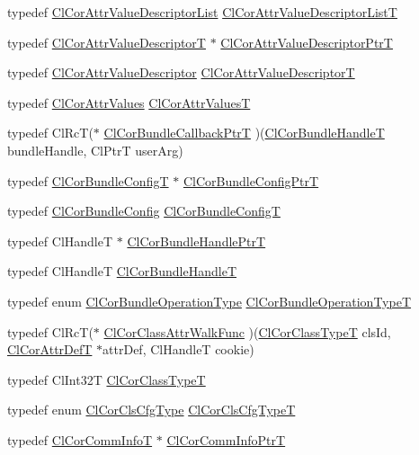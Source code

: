 \begin{CompactItemize}
\item 
typedef \hyperlink{struct_cl_cor_attr_value_descriptor_list}{Cl\-Cor\-Attr\-Value\-Descriptor\-List} \hyperlink{group__group13_ga47}{Cl\-Cor\-Attr\-Value\-Descriptor\-List\-T}
\item 
typedef \hyperlink{struct_cl_cor_attr_value_descriptor}{Cl\-Cor\-Attr\-Value\-Descriptor\-T} $\ast$ \hyperlink{group__group13_ga46}{Cl\-Cor\-Attr\-Value\-Descriptor\-Ptr\-T}
\item 
typedef \hyperlink{struct_cl_cor_attr_value_descriptor}{Cl\-Cor\-Attr\-Value\-Descriptor} \hyperlink{group__group13_ga45}{Cl\-Cor\-Attr\-Value\-Descriptor\-T}
\item 
typedef \hyperlink{struct_cl_cor_attr_values}{Cl\-Cor\-Attr\-Values} \hyperlink{group__group13_ga11}{Cl\-Cor\-Attr\-Values\-T}
\item 
typedef Cl\-Rc\-T($\ast$ \hyperlink{group__group13_ga56}{Cl\-Cor\-Bundle\-Callback\-Ptr\-T} )(\hyperlink{group__group13_ga7}{Cl\-Cor\-Bundle\-Handle\-T} bundle\-Handle, Cl\-Ptr\-T user\-Arg)
\item 
typedef \hyperlink{struct_cl_cor_bundle_config}{Cl\-Cor\-Bundle\-Config\-T} $\ast$ \hyperlink{group__group13_ga52}{Cl\-Cor\-Bundle\-Config\-Ptr\-T}
\item 
typedef \hyperlink{struct_cl_cor_bundle_config}{Cl\-Cor\-Bundle\-Config} \hyperlink{group__group13_ga51}{Cl\-Cor\-Bundle\-Config\-T}
\item 
typedef Cl\-Handle\-T $\ast$ \hyperlink{group__group13_ga8}{Cl\-Cor\-Bundle\-Handle\-Ptr\-T}
\item 
typedef Cl\-Handle\-T \hyperlink{group__group13_ga7}{Cl\-Cor\-Bundle\-Handle\-T}
\item 
typedef enum \hyperlink{group__group13_ga336}{Cl\-Cor\-Bundle\-Operation\-Type} \hyperlink{group__group13_ga20}{Cl\-Cor\-Bundle\-Operation\-Type\-T}
\item 
typedef Cl\-Rc\-T($\ast$ \hyperlink{group__group13_ga14}{Cl\-Cor\-Class\-Attr\-Walk\-Func} )(\hyperlink{group__group13_ga2}{Cl\-Cor\-Class\-Type\-T} cls\-Id, \hyperlink{struct_cl_cor_attr_def}{Cl\-Cor\-Attr\-Def\-T} $\ast$attr\-Def, Cl\-Handle\-T cookie)
\item 
typedef Cl\-Int32T \hyperlink{group__group13_ga2}{Cl\-Cor\-Class\-Type\-T}
\item 
typedef enum \hyperlink{group__group13_ga341}{Cl\-Cor\-Cls\-Cfg\-Type} \hyperlink{group__group13_ga61}{Cl\-Cor\-Cls\-Cfg\-Type\-T}
\item 
typedef \hyperlink{struct_cl_cor_comm_info}{Cl\-Cor\-Comm\-Info\-T} $\ast$ \hyperlink{group__group13_ga24}{Cl\-Cor\-Comm\-Info\-Ptr\-T}

\end{CompactItemize}
